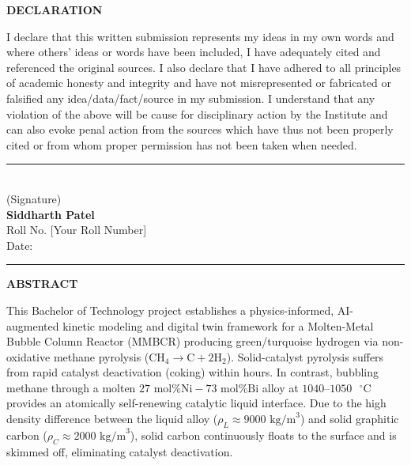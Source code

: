 \documentclass[12pt,a4paper,oneside]{report}
\begin{document}
\newpage

\begin{center}
{\fontsize{16}{20}\selectfont \textbf{DECLARATION}\par}
\end{center}
\vspace{15mm}

\noindent I declare that this written submission represents my ideas in my own words and where others' ideas or words have been included, I have adequately cited and referenced the original sources. I also declare that I have adhered to all principles of academic honesty and integrity and have not misrepresented or fabricated or falsified any idea/data/fact/source in my submission. I understand that any violation of the above will be cause for disciplinary action by the Institute and can also evoke penal action from the sources which have thus not been properly cited or from whom proper permission has not been taken when needed.

\vspace{45mm}
\noindent
\begin{flushright}
\rule{65mm}{0.4pt}\\
(Signature)\\[5mm]
\textbf{Siddharth Patel}\\
Roll No. [Your Roll Number]\\
Date: \rule{40mm}{0.4pt}
\end{flushright}

\newpage

\begin{center}
{\fontsize{16}{20}\selectfont \textbf{ABSTRACT}\par}
\end{center}
\vspace{10mm}

\noindent This Bachelor of Technology project establishes a physics-informed, AI-augmented kinetic modeling and digital twin framework for a Molten-Metal Bubble Column Reactor (MMBCR) producing green/turquoise hydrogen via non-oxidative methane pyrolysis ($\text{CH}_4 \rightarrow \text{C} + 2\text{H}_2$). Solid-catalyst pyrolysis suffers from rapid catalyst deactivation (coking) within hours. In contrast, bubbling methane through a molten $27\text{ mol\% Ni}-73\text{ mol\% Bi}$ alloy at $1040\text{--}1050\text{ }^\circ\text{C}$ provides an atomically self-renewing catalytic liquid interface. Due to the high density difference between the liquid alloy ($\rho_L \approx 9000\text{ kg/m}^3$) and solid graphitic carbon ($\rho_C \approx 2000\text{ kg/m}^3$), solid carbon continuously floats to the surface and is skimmed off, eliminating catalyst deactivation.
\end{document}
